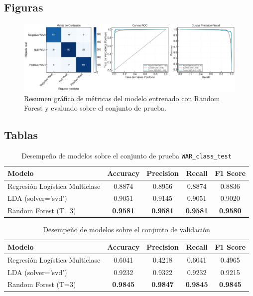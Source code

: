 \subsection{Figuras}



\begin{figure}[H]
    \centering
    \includegraphics[width=0.8\linewidth]{figures//p2/roc_pr_random_forest_test.png}
    \caption{Resumen gráfico de métricas del modelo entrenado con Random Forest y evaluado sobre el conjunto de prueba.}
    \label{fig:roc_pr_random_forest_test}
\end{figure}


\subsection{Tablas}


\begin{table}[H]
\centering
\caption{Desempeño de modelos sobre el conjunto de prueba \texttt{WAR\_class\_test} }
\label{tab:metrics_war_class}
\begin{tabular}{lcccc}
\toprule
\textbf{Modelo} & \textbf{Accuracy} & \textbf{Precision} & \textbf{Recall} & \textbf{F1 Score} \\
\midrule
Regresión Logística Multiclase & 0.8874 & 0.8956 & 0.8874 & 0.8836 \\
LDA (solver='svd') & 0.9051 & 0.9145 & 0.9051 & 0.9020 \\
Random Forest (T=3) & \textbf{0.9581} & \textbf{0.9581} & \textbf{0.9581} & \textbf{0.9580} \\
\bottomrule
\end{tabular}
\end{table}

\begin{table}[H]
\centering
\caption{Desempeño de modelos sobre el conjunto de validación}
\label{tab:val_war_class}
\begin{tabular}{lcccc}
\toprule
\textbf{Modelo} & \textbf{Accuracy} & \textbf{Precision} & \textbf{Recall} & \textbf{F1 Score} \\
\midrule
Regresión Logística Multiclase & 0.6041 & 0.4218 & 0.6041 & 0.4965 \\
LDA (solver='svd') & 0.9232 & 0.9322 & 0.9232 & 0.9215 \\
Random Forest (T=3) & \textbf{0.9845} & \textbf{0.9847} & \textbf{0.9845} & \textbf{0.9845} \\
\bottomrule
\end{tabular}
\end{table}



